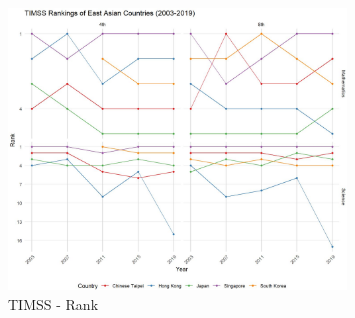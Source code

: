 \documentclass[12pt,a4paper,onecolumn]{article}
\numberwithin{equation}{section}
\begin{document}
\begin{figure}[ht!]
    \centering
        \includegraphics[width=0.8\textwidth]{TIMMS_rank.JPG}
    \caption{TIMSS - Rank}
    \label{fig:TIMMS_RANK}
\end{figure}
\end{document}

